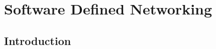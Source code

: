 \chapter{Software Defined Networking} \label{chap:sdn_intro} %

\section {Introduction}
\hspace {5mm}


